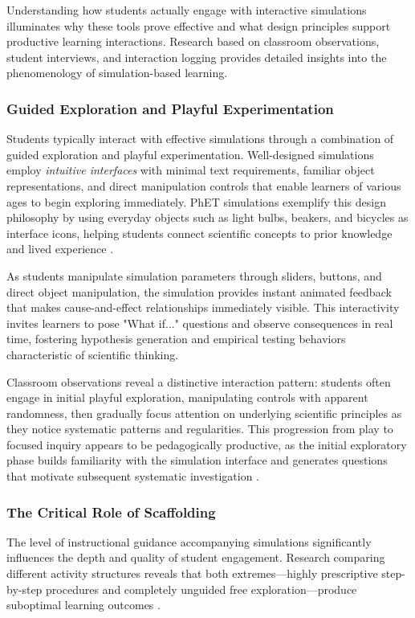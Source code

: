 Understanding how students actually engage with interactive simulations illuminates why these tools prove effective and what design principles support productive learning interactions. Research based on classroom observations, student interviews, and interaction logging provides detailed insights into the phenomenology of simulation-based learning.

\subsubsection{Guided Exploration and Playful Experimentation}

Students typically interact with effective simulations through a combination of guided exploration and playful experimentation. Well-designed simulations employ \textit{intuitive interfaces} with minimal text requirements, familiar object representations, and direct manipulation controls that enable learners of various ages to begin exploring immediately. PhET simulations exemplify this design philosophy by using everyday objects such as light bulbs, beakers, and bicycles as interface icons, helping students connect scientific concepts to prior knowledge and lived experience \cite{phet2023}.

As students manipulate simulation parameters through sliders, buttons, and direct object manipulation, the simulation provides instant animated feedback that makes cause-and-effect relationships immediately visible. This interactivity invites learners to pose "What if..." questions and observe consequences in real time, fostering hypothesis generation and empirical testing behaviors characteristic of scientific thinking.

Classroom observations reveal a distinctive interaction pattern: students often engage in initial playful exploration, manipulating controls with apparent randomness, then gradually focus attention on underlying scientific principles as they notice systematic patterns and regularities. This progression from play to focused inquiry appears to be pedagogically productive, as the initial exploratory phase builds familiarity with the simulation interface and generates questions that motivate subsequent systematic investigation \cite{phet2023}.

\subsubsection{The Critical Role of Scaffolding}

The level of instructional guidance accompanying simulations significantly influences the depth and quality of student engagement. Research comparing different activity structures reveals that both extremes—highly prescriptive step-by-step procedures and completely unguided free exploration—produce suboptimal learning outcomes \cite{phet2023}.

